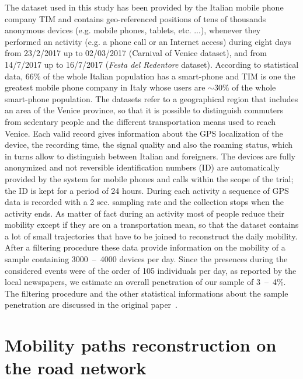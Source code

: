 \documentclass{standalone}
\begin{document}
The dataset used in this study has been provided by the Italian mobile phone company TIM and contains geo-referenced positions of tens of thousands anonymous devices (e.g. mobile phones, tablets, etc. ...), whenever they performed an activity (e.g. a phone call or an Internet access) during eight days from 23/2/2017 up to 02/03/2017 (Carnival of Venice dataset), and from 14/7/2017 up to 16/7/2017 (\emph{Festa del Redentore} dataset).
According to statistical data, 66\% of the whole Italian population has a smart-phone and TIM is one the greatest mobile phone company in Italy whose users are $\sim30\%$ of the whole smart-phone population.
The datasets refer to a geographical region that includes an area of the Venice province, so that it is possible to distinguish commuters from sedentary people and the different transportation means used to reach Venice.
Each valid record gives information about the GPS localization of the device, the recording time, the signal quality and also the roaming status, which in turns allow to distinguish between Italian and
foreigners.
The devices are fully anonymized and not reversible identification numbers (ID) are automatically provided by the system for mobile phones and calls within the scope of the trial; the ID is kept for a period of 24 hours.
During each activity a sequence of GPS data is recorded with a 2 sec. sampling rate and the collection stops when the activity ends.
As matter of fact during an activity most of people reduce their mobility except if they are on a transportation mean, so that the dataset contains a lot of small trajectories that have to be joined to reconstruct the daily mobility.
After a filtering procedure these data provide information on the mobility of a sample containing 3000~–~4000 devices per day.
Since the presences during the considered events were of the order of 105 individuals per day, as reported by the local newspapers, we estimate an overall penetration of our sample of 3~–~4\%.
The filtering procedure and the other statistical informations about the sample penetration are discussed in the original paper~\cite{Mizzi2018}.

\section*{Mobility paths reconstruction on the road network}
\end{document}
